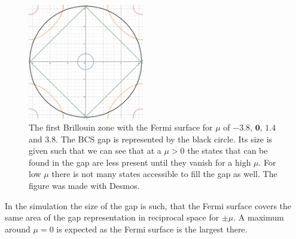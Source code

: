 \documentclass[..\main.tex]{subfile}
\begin{document}
\begin{figure}[H]
  \centering
  \includegraphics[width=0.45\textwidth]{Ressources/GapBrillouin.png}
  \caption{The first Brillouin zone with the Fermi surface for $\mu$ of \textcolor{Brillou1}{$\bm{-3.8}$}, \textcolor{Brillou2}{$\bm{0}$},
  \textcolor{Brillou3}{$\bm{1.4}$} and \textcolor{Brillou4}{$\bm{3.8}$}. The BCS gap is represented by the black circle. Its size is given such that 
  we can see that at a $\mu>0$ the states that can be found in the gap are less present until they vanish for a high $\mu$. For low $\mu$ there is
  not many states accessible to fill the gap as well. The figure was made with Desmos.}
  \label{fig:Brillouin}
\end{figure}
In the simulation the size of the gap is such, that the Fermi surface 
covers the same area of the gap representation in reciprocal space for $\pm\mu$.
A maximum around $\mu=0$ is expected as the Fermi surface is the largest there.   
\end{document}
